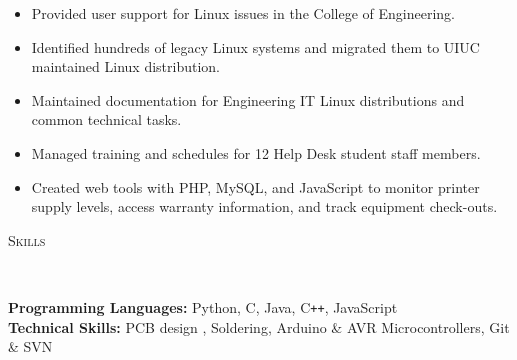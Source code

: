 \documentclass{article}
\newenvironment{changemargin}[2]{%
  \begin{list}{}{%
    \setlength{\topsep}{0pt}%
    \setlength{\leftmargin}{#1}%
    \setlength{\rightmargin}{#2}%
    \setlength{\listparindent}{\parindent}%
    \setlength{\itemindent}{\parindent}%
    \setlength{\parsep}{\parskip}%
  }%
  \item[]}{\end{list}
}
\newcommand{\lineover}{
	\begin{changemargin}{-0.05in}{-0.05in}
		\vspace*{-8pt}
		\hrulefill \\
		\vspace*{-2pt}
	\end{changemargin}
}
\newcommand{\header}[1]{
	\begin{changemargin}{-0.5in}{-0.5in}
		\scshape{#1}\\
  	\lineover
	\end{changemargin}
}
\newenvironment{body} {
	\vspace*{-16pt}
	\begin{changemargin}{-0.25in}{-0.5in}
  }	
	{\end{changemargin}
}
\begin{document}
\begin{body}
	\begin{itemize} \itemsep -0pt  %
		\item Provided user support for Linux issues in the College of Engineering.
		\item Identified hundreds of legacy Linux systems and migrated them to UIUC maintained Linux distribution.
		\item Maintained documentation for Engineering IT Linux distributions and common technical tasks.
		\item Managed training and schedules for 12 Help Desk student staff members.
		\item Created web tools with PHP, MySQL, and JavaScript to monitor printer supply levels, access warranty information, and track equipment check-outs.
	\end{itemize}

\end{body}

\smallskip

\header{Skills}

\begin{body}
	\vspace{14pt}
	\textbf{Programming Languages:}{} Python, C, Java, C{}\verb!++!, JavaScript\\%
	\textbf{Technical Skills:}{} PCB design , Soldering, Arduino \& AVR Microcontrollers, Git \& SVN\\
\end{body}

\smallskip

\end{document}
